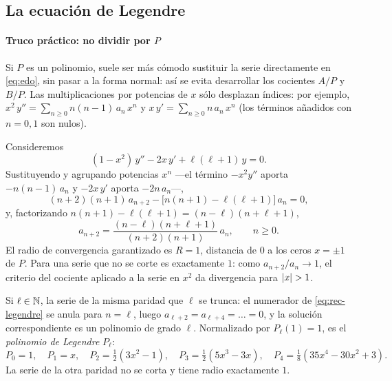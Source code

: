 

\subsection{La ecuación de Legendre}\label{sec:legendre}
\paragraph{Truco práctico: no dividir por $P$}
Si $P$ es un polinomio, suele ser más cómodo sustituir la serie
directamente en \eqref{eq:edo}, sin pasar a la forma normal: así se evita
desarrollar los cocientes $A/P$ y $B/P$. Las multiplicaciones por potencias
de $x$ sólo desplazan índices: por ejemplo,
$x^{2}\,y''=\sum_{n\ge0}n(n-1)\,a_n\,x^{n}$ y $x\,y'=\sum_{n\ge0}n\,a_n\,x^{n}$
(los términos añadidos con $n=0,1$ son nulos).

\begin{ejemplo}[Legendre en $x_0=0$]\label{ej:legendre}
Consideremos
\begin{equation}\label{eq:legendre}
  (1-x^{2})\,y''-2x\,y'+\ell(\ell+1)\,y=0 .
\end{equation}
Sustituyendo y agrupando potencias $x^{n}$ ---el término $-x^{2}y''$ aporta
$-n(n-1)\,a_n$ y $-2x\,y'$ aporta $-2n\,a_n$---,
\begin{equation}\label{eq:rec-legendre-0}
  (n+2)(n+1)\,a_{n+2}-\bigl[n(n+1)-\ell(\ell+1)\bigr]\,a_n=0 ,
\end{equation}
y, factorizando $n(n+1)-\ell(\ell+1)=(n-\ell)(n+\ell+1)$,
\begin{equation}\label{eq:rec-legendre}
  \boxed{\;a_{n+2}=\frac{(n-\ell)(n+\ell+1)}{(n+2)(n+1)}\,a_n ,\qquad n\ge0.\;}
\end{equation}
El radio de convergencia garantizado es $R=1$, distancia de $0$ a los ceros
$x=\pm1$ de $P$. Para una serie que no se corte es exactamente $1$: como
$a_{n+2}/a_n\to1$, el criterio del cociente aplicado a la serie en $x^{2}$
da divergencia para $\lvert x\rvert>1$.
\end{ejemplo}

\begin{proposicion}\label{prop:polinomios-legendre}
Si $\ell\in\mathbb{N}$, la serie de la misma paridad que $\ell$ se trunca: el
numerador de \eqref{eq:rec-legendre} se anula para $n=\ell$, luego
$a_{\ell+2}=a_{\ell+4}=\dots=0$, y la solución correspondiente es un
polinomio de grado $\ell$. Normalizado por $P_\ell(1)=1$, es el
\emph{polinomio de Legendre} $P_\ell$:
\[
  P_0=1,\quad P_1=x,\quad P_2=\tfrac12(3x^{2}-1),\quad
  P_3=\tfrac12(5x^{3}-3x),\quad P_4=\tfrac18(35x^{4}-30x^{2}+3).
\]
La serie de la otra paridad no se corta y tiene radio exactamente $1$.
\end{proposicion}

